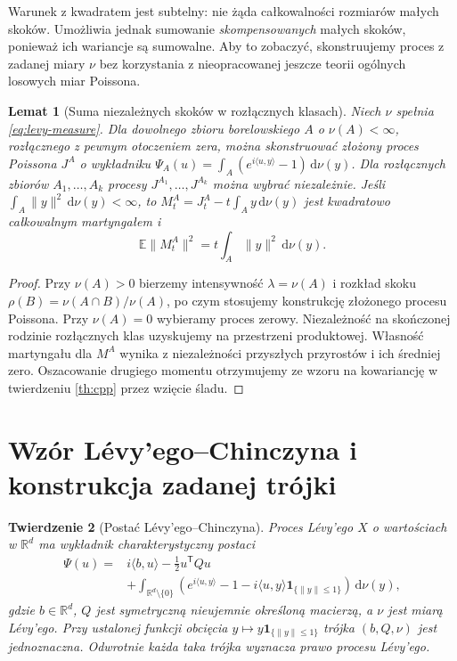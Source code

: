\documentclass[11pt,a4paper,oneside]{report}
\numberwithin{equation}{chapter}
\theoremstyle{plain}
\newtheorem{twierdzenie}{Twierdzenie}[chapter]
\newtheorem{lemat}[twierdzenie]{Lemat}
\theoremstyle{definition}
\theoremstyle{remark}
\newcommand{\R}{\mathbb{R}}
\newcommand{\E}{\mathbb{E}}
\newcommand{\ind}[1]{\mathbf{1}_{#1}}
\newcommand{\dd}{\mathrm{d}}
\begin{document}
Warunek z kwadratem jest subtelny: nie żąda całkowalności
rozmiarów małych skoków. Umożliwia jednak sumowanie
\emph{skompensowanych} małych skoków, ponieważ ich wariancje
są sumowalne. Aby to zobaczyć, skonstruujemy proces z zadanej
miary $\nu$ bez korzystania z nieopracowanej jeszcze teorii
ogólnych losowych miar Poissona.

\begin{lemat}[Suma niezależnych skoków w rozłącznych klasach]
\label{lem:annular}
Niech $\nu$ spełnia \eqref{eq:levy-measure}. Dla dowolnego
zbioru borelowskiego $A$ o $\nu(A)<\infty$, rozłącznego z
pewnym otoczeniem zera, można skonstruować złożony proces
Poissona $J^A$ o wykładniku
$\Psi_A(u)=\int_A(e^{i\langle u,y\rangle}-1)\,\dd\nu(y)$.
Dla rozłącznych zbiorów $A_1,\ldots,A_k$ procesy
$J^{A_1},\ldots,J^{A_k}$ można wybrać niezależnie.
Jeśli $\int_A\|y\|^2\,\dd\nu(y)<\infty$, to
$M_t^A=J_t^A-t\int_Ay\,\dd\nu(y)$ jest
kwadratowo całkowalnym martyngałem i
\[
\E\|M_t^A\|^2=t\int_A\|y\|^2\,\dd\nu(y).
\]
\end{lemat}
\begin{proof}
Przy $\nu(A)>0$ bierzemy intensywność
$\lambda=\nu(A)$ i rozkład skoku
$\rho(B)=\nu(A\cap B)/\nu(A)$, po czym stosujemy
konstrukcję złożonego procesu Poissona. Przy $\nu(A)=0$
wybieramy proces zerowy. Niezależność na skończonej rodzinie
rozłącznych klas uzyskujemy na przestrzeni produktowej.
Własność martyngału dla $M^A$ wynika z niezależności
przyszłych przyrostów i ich średniej zero.
Oszacowanie drugiego momentu otrzymujemy ze wzoru na
kowariancję w twierdzeniu \ref{th:cpp} przez wzięcie śladu.
\end{proof}

\section{Wzór Lévy'ego--Chinczyna i konstrukcja zadanej trójki}

\begin{twierdzenie}[Postać Lévy'ego--Chinczyna]
\label{th:LK}
Proces Lévy'ego $X$ o wartościach w $\R^d$ ma wykładnik
charakterystyczny postaci
\[
\begin{split}
\Psi(u)={}&i\langle b,u\rangle-\frac12u^{\mathsf T}Qu\\
&+\int_{\R^d\setminus\{0\}}
\left(e^{i\langle u,y\rangle}-1
-i\langle u,y\rangle\ind{\{\|y\|\le1\}}\right)\,\dd\nu(y),
\end{split}
\tag{10.3}\label{eq:LK}
\]
gdzie $b\in\R^d$, $Q$ jest symetryczną
nieujemnie określoną macierzą, a $\nu$ jest miarą
Lévy'ego. Przy ustalonej funkcji obcięcia
$y\mapsto y\ind{\{\|y\|\le1\}}$ trójka $(b,Q,\nu)$
jest jednoznaczna. Odwrotnie każda taka trójka wyznacza
prawo procesu Lévy'ego.
\end{twierdzenie}
\end{document}
